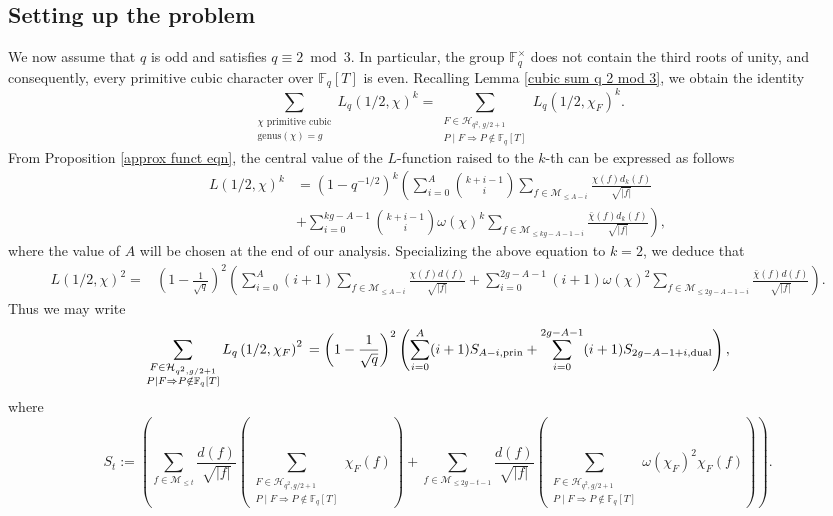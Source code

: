 \documentclass[table]{amsart}
\newcommand{\F}{\mathbb{F}}
\newcommand{\cM}{\mathcal{M}}
\numberwithin{equation}{section}
\begin{document}
\subsection{Setting up the problem}\label{s 3.1}
\par We now assume that \( q \) is odd and satisfies \( q \equiv 2 \bmod{3} \). In particular, the group \( \F_q^\times \) does not contain the third roots of unity, and consequently, every primitive cubic character over \( \F_q[T] \) is even. Recalling Lemma \ref{cubic sum q 2 mod 3}, we obtain the identity
\[
\sum_{\substack{\chi \text{ primitive cubic} \\ \text{genus}(\chi) = g}} L_q(1/2, \chi)^k 
= \sum_{\substack{F \in \mathcal{H}_{q^2,\, g/2 + 1} \\ P \mid F \Rightarrow P \notin \F_q[T]}} L_q(1/2, \chi_F)^k.
\]
\noindent From Proposition \ref{approx funct eqn}, the central value of the \( L \)-function raised to the \( k \)-th can be expressed as follows
\begin{align*}
    L(1/2, \chi)^k &= (1 - q^{-1/2})^k \left( \sum_{i=0}^{A} \binom{k+i-1}{i} \sum_{f \in \cM_{\leq A - i}} \frac{\chi(f) d_k(f)}{\sqrt{|f|}} \right.\\&+ \left.\sum_{i=0}^{kg - A - 1} \binom{k+i-1}{i} \omega(\chi)^k \sum_{f \in \cM_{\leq kg - A - 1 - i}} \frac{\bar{\chi}(f) d_k(f)}{\sqrt{|f|}} \right),
\end{align*}
\noindent where the value of $A$ will be chosen at the end of our analysis. Specializing the above equation to $k=2$, we deduce that
{\small \[\begin{split}L(1/2, \chi)^2=& \left(1-\frac{1}{\sqrt{q}}\right)^2\left(\sum_{i=0}^{A}(i+1)\sum_{f\in \cM_{\leq A-i}}\frac{\chi(f)d(f)}{\sqrt{|f|}}+ \sum_{i=0}^{2g-A-1}(i+1)\omega(\chi)^2\sum_{f\in \cM_{\leq 2g-A-1-i}}  \frac{\bar{\chi}(f) d(f)}{\sqrt{|f|}}\right).
\end{split}\]}
\noindent Thus we may write 
\begin{equation}\label{princ+dual}
    \sum_{\substack{F \in \mathcal{H}_{q^{2}, g / 2+1} \\ P \mid F \Rightarrow P \notin \mathbb{F}_{q}[T]}} L_{q}\left(1 / 2, \chi_{F}\right)^2 \\
  = \left(1-\frac{1}{\sqrt{q}}\right)^2\left(\sum_{i=0}^{A}(i+1)S_{A-i, \rm{prin}}+\sum_{i=0}^{2g-A-1}(i+1)S_{2g-A-1+i, \rm{dual}}\right), 
\end{equation}
 \iffalse where 
  \[S_t:=\left(\sum_{f\in \cM_{\leq t}}\frac{d(f)}{\sqrt{|f|}}\left(\sum_{\substack{F \in \mathcal{H}_{q^{2}, g / 2+1} \\ P \mid F \Rightarrow P \notin \mathbb{F}_{q}[T]}} \chi_F(f)\right)+ \sum_{f\in \cM_{\leq 2g-t-1}}  \frac{d(f)}{\sqrt{|f|}}\left(\sum_{\substack{F \in \mathcal{H}_{q^{2}, g / 2+1} \\ P \mid F \Rightarrow P \notin \mathbb{F}_{q}[T]}} \omega(\chi_F)^2\chi_F(f)\right)\right).\]
\end{document}
